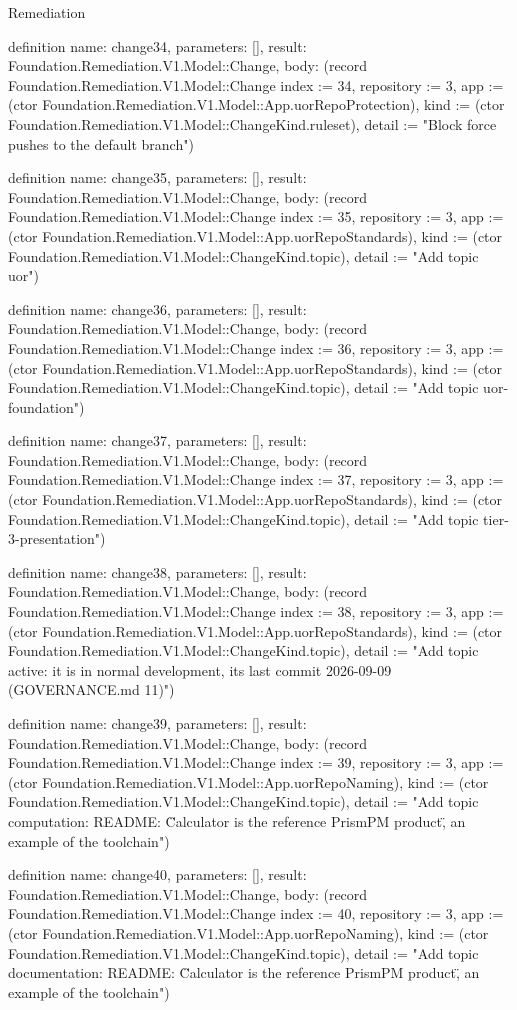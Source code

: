 \begin{lexlean}{Remediation}
\begin{semanticmodule}
definition{
  name: change34,
  parameters: [],
  result: Foundation.Remediation.V1.Model::Change,
  body: (record Foundation.Remediation.V1.Model::Change {index := 34, repository := 3, app := (ctor Foundation.Remediation.V1.Model::App.uorRepoProtection), kind := (ctor Foundation.Remediation.V1.Model::ChangeKind.ruleset), detail := "Block force pushes to the default branch"})
}

definition{
  name: change35,
  parameters: [],
  result: Foundation.Remediation.V1.Model::Change,
  body: (record Foundation.Remediation.V1.Model::Change {index := 35, repository := 3, app := (ctor Foundation.Remediation.V1.Model::App.uorRepoStandards), kind := (ctor Foundation.Remediation.V1.Model::ChangeKind.topic), detail := "Add topic uor"})
}

definition{
  name: change36,
  parameters: [],
  result: Foundation.Remediation.V1.Model::Change,
  body: (record Foundation.Remediation.V1.Model::Change {index := 36, repository := 3, app := (ctor Foundation.Remediation.V1.Model::App.uorRepoStandards), kind := (ctor Foundation.Remediation.V1.Model::ChangeKind.topic), detail := "Add topic uor-foundation"})
}

definition{
  name: change37,
  parameters: [],
  result: Foundation.Remediation.V1.Model::Change,
  body: (record Foundation.Remediation.V1.Model::Change {index := 37, repository := 3, app := (ctor Foundation.Remediation.V1.Model::App.uorRepoStandards), kind := (ctor Foundation.Remediation.V1.Model::ChangeKind.topic), detail := "Add topic tier-3-presentation"})
}

definition{
  name: change38,
  parameters: [],
  result: Foundation.Remediation.V1.Model::Change,
  body: (record Foundation.Remediation.V1.Model::Change {index := 38, repository := 3, app := (ctor Foundation.Remediation.V1.Model::App.uorRepoStandards), kind := (ctor Foundation.Remediation.V1.Model::ChangeKind.topic), detail := "Add topic active: it is in normal development, its last commit 2026-09-09 (GOVERNANCE.md 11)"})
}

definition{
  name: change39,
  parameters: [],
  result: Foundation.Remediation.V1.Model::Change,
  body: (record Foundation.Remediation.V1.Model::Change {index := 39, repository := 3, app := (ctor Foundation.Remediation.V1.Model::App.uorRepoNaming), kind := (ctor Foundation.Remediation.V1.Model::ChangeKind.topic), detail := "Add topic computation: README: \"Calculator is the reference PrismPM product\", an example of the toolchain"})
}

definition{
  name: change40,
  parameters: [],
  result: Foundation.Remediation.V1.Model::Change,
  body: (record Foundation.Remediation.V1.Model::Change {index := 40, repository := 3, app := (ctor Foundation.Remediation.V1.Model::App.uorRepoNaming), kind := (ctor Foundation.Remediation.V1.Model::ChangeKind.topic), detail := "Add topic documentation: README: \"Calculator is the reference PrismPM product\", an example of the toolchain"})
}


\end{semanticmodule}
\end{lexlean}
